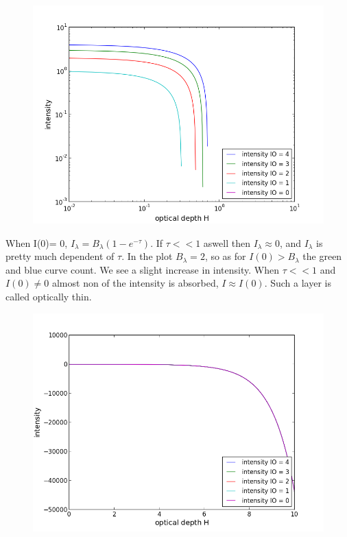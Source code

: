 \documentclass[norsk,a4paper,12pt]{article}
\begin{document}
\begin{figure}[H] 
\begin{center} 
\includegraphics[scale=0.5]{ssa32_2.png} 
 

\caption{} 
\end{center} 
\end{figure}




When I(0)= 0, $I_{\lambda} = B_{\lambda}(1-e^{-\tau})$. If $\tau<<1 $ aswell then $I_{\lambda}\approx 0 $, and 
$I_{\lambda} $ is pretty much dependent of $\tau $. In the plot $B_{\lambda}=2 $, so as for $I(0) > B_{\lambda}$ the green 
and blue curve count. We see a slight increase in intensity. 
When $\tau<<1 $ and $I(0)\neq0$ almost non of the intensity is absorbed, $I \approx I(0) $. Such a layer is called 
optically thin.

\begin{figure}[H] 
\begin{center} 
\includegraphics[scale=0.5]{ssa32_1.png} 
 

\caption{} 
\end{center} 
\end{figure}
\end{document}
